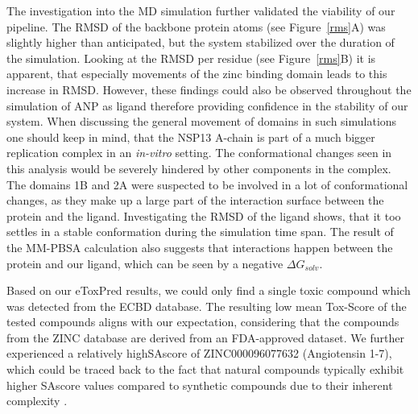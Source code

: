 \documentclass[11pt, letterpaper, titlepage]{article}
\renewcommand{\cite}{\parencite}
\begin{document}
The investigation into the \acf{MD} simulation further validated the viability of our pipeline. The RMSD of the backbone protein atoms (see Figure~\ref{rms}A) was slightly higher than anticipated, but the system stabilized over the duration of the simulation. Looking at the RMSD per residue (see Figure~\ref{rms}B) it is apparent, that especially movements of the zinc binding domain leads to this increase in RMSD. However, these findings could also be observed throughout the simulation of ANP as ligand therefore providing confidence in the stability of our system. When discussing the general movement of domains in such simulations one should keep in mind, that the NSP13 A-chain is part of a much bigger replication complex \cite{NSP13_basics} in an \textit{in-vitro} setting. The conformational changes seen in this analysis would be severely hindered by other components in the complex. The domains 1B and 2A were suspected to be involved in a lot of conformational changes, as they make up a large part of the interaction surface between the protein and the ligand. Investigating the RMSD of the ligand shows, that it too settles in a stable conformation during the simulation time span. The result of the \ac{MM-PBSA} calculation also suggests that interactions happen between the protein and our ligand, which can be seen by a negative $\Delta G_{solv}$.

Based on our eToxPred results, we could only find a single toxic compound which was detected from the ECBD database. The resulting low mean Tox-Score of the tested compounds aligns with our expectation, considering that the compounds from the ZINC database are derived from an \ac{FDA}-approved dataset. We further experienced a relatively high\ac{SAscore} of ZINC000096077632 (Angiotensin 1-7), which could be traced back to the fact that natural compounds typically exhibit higher \ac{SAscore} values compared to synthetic compounds due to their inherent complexity \cite{pu2019toxpred}.
\end{document}

